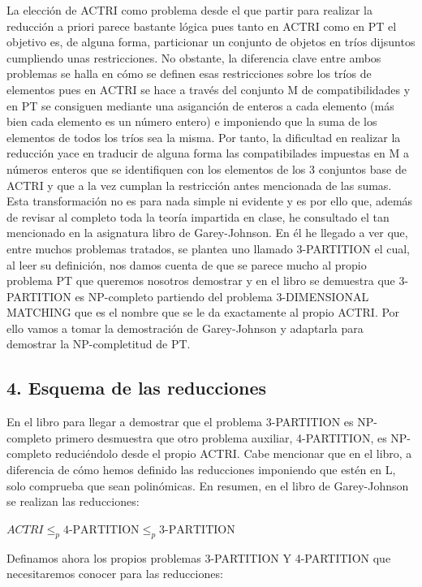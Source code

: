 \documentclass{article}
\begin{document}
La elección de ACTRI como problema desde el que partir para realizar la reducción a priori parece bastante lógica pues tanto en ACTRI como en PT el objetivo es, de alguna forma, particionar un conjunto de objetos en tríos dijsuntos cumpliendo unas restricciones. No obstante, la diferencia clave entre ambos problemas se halla en cómo se definen esas restricciones sobre los tríos de elementos pues en ACTRI se hace a través del conjunto M de compatibilidades y en PT se consiguen mediante una asiganción de enteros a cada elemento (más bien cada elemento es un número entero) e imponiendo que la suma de los elementos de todos los tríos sea la misma. Por tanto, la dificultad en realizar la reducción yace en traducir de alguna forma las compatibilades impuestas en M a números enteros que se identifiquen con los elementos de los 3 conjuntos base de ACTRI y que a la vez cumplan la restricción antes mencionada de las sumas. Esta transformación no es para nada simple ni evidente y es por ello que, además de revisar al completo toda la teoría impartida en clase, he consultado el tan mencionado en la asignatura libro de Garey-Johnson. En él he llegado a ver que, entre muchos problemas tratados, se plantea uno llamado 3-PARTITION el cual, al leer su definición, nos damos cuenta de que se parece mucho al propio problema PT que queremos nosotros demostrar y en el libro se demuestra que 3-PARTITION es NP-completo partiendo del problema 3-DIMENSIONAL MATCHING que es el nombre que se le da exactamente al propio ACTRI. Por ello vamos a tomar la demostración de Garey-Johnson y adaptarla  para demostrar la NP-completitud de PT.


\subsection*{4. Esquema de las reducciones}

En el libro para llegar a demostrar que el problema 3-PARTITION es NP-completo primero desmuestra que otro problema auxiliar, 4-PARTITION, es NP-completo reduciéndolo desde el propio ACTRI. Cabe mencionar que en el libro, a diferencia de cómo hemos definido las reducciones imponiendo que estén en L, solo comprueba que sean polinómicas. En resumen, en el libro de Garey-Johnson se realizan las reducciones:

\vspace{1\baselineskip}
$ACTRI
\le_p
4\text{-PARTITION}
\le_p
3\text{-PARTITION}$

\vspace{1\baselineskip}
Definamos ahora los propios problemas 3-PARTITION Y 4-PARTITION que necesitaremos conocer para las reducciones:
\end{document}
